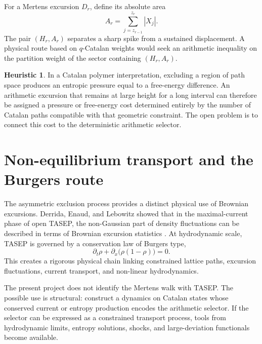 \documentclass[11pt]{amsart}
\numberwithin{equation}{section}
\theoremstyle{plain}
\theoremstyle{definition}
\newtheorem{heuristic}[theorem]{Heuristic}
\theoremstyle{remark}
\begin{document}
For a Mertens excursion $D_r$, define its absolute area
\begin{equation}
A_r
=
\sum_{j=z_{r-1}}^{z_r}|X_j|.
\label{eq:mertens_excursion_area}
\end{equation}
The pair $(H_r,A_r)$ separates a sharp spike from a sustained displacement.  A physical route based on $q$-Catalan weights would seek an arithmetic inequality on the partition weight of the sector containing $(H_r,A_r)$.

\begin{heuristic}
\label{heur:entropic_pressure}
In a Catalan polymer interpretation, excluding a region of path space produces an entropic pressure equal to a free-energy difference.  An arithmetic excursion that remains at large height for a long interval can therefore be assigned a pressure or free-energy cost determined entirely by the number of Catalan paths compatible with that geometric constraint.  The open problem is to connect this cost to the deterministic arithmetic selector.
\end{heuristic}

\section{Non-equilibrium transport and the Burgers route}
\label{sec:tasep_burgers}

The asymmetric exclusion process provides a distinct physical use of Brownian excursions.  Derrida, Enaud, and Lebowitz showed that in the maximal-current phase of open TASEP, the non-Gaussian part of density fluctuations can be described in terms of Brownian excursion statistics \cite{DerridaEnaudLebowitz2004}.  At hydrodynamic scale, TASEP is governed by a conservation law of Burgers type,
\begin{equation}
\partial_t\rho
+
\partial_x\bigl(\rho(1-\rho)\bigr)
=0.
\label{eq:tasep_burgers}
\end{equation}
This creates a rigorous physical chain linking constrained lattice paths, excursion fluctuations, current transport, and non-linear hydrodynamics.

The present project does not identify the Mertens walk with TASEP.  The possible use is structural: construct a dynamics on Catalan states whose conserved current or entropy production encodes the arithmetic selector.  If the selector can be expressed as a constrained transport process, tools from hydrodynamic limits, entropy solutions, shocks, and large-deviation functionals become available.
\end{document}
